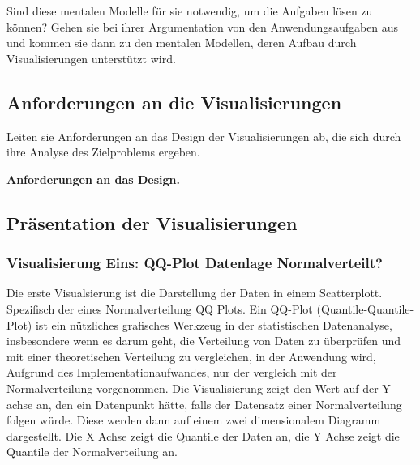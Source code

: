 \documentclass[usegeometry=true]{scrartcl}
\begin{document}
Sind diese mentalen Modelle für sie notwendig, um die Aufgaben lösen zu können? 
Gehen sie bei ihrer Argumentation von den Anwendungsaufgaben aus und kommen sie dann zu den mentalen Modellen, deren Aufbau durch Visualisierungen unterstützt wird. 
\subsection{Anforderungen an die Visualisierungen}
Leiten sie Anforderungen an das Design der Visualisierungen ab, die sich durch ihre Analyse des Zielproblems ergeben.

\textbf{ Anforderungen an das Design. }
\subsection{Präsentation der Visualisierungen}






\subsubsection{Visualisierung Eins: QQ-Plot Datenlage Normalverteilt?}

Die erste Visualsierung ist die Darstellung der Daten in einem Scatterplott. Spezifisch der eines Normalverteilung QQ Plots. 
Ein QQ-Plot (Quantile-Quantile-Plot) ist ein nützliches grafisches Werkzeug in der statistischen Datenanalyse, insbesondere wenn es darum geht, die Verteilung von Daten zu überprüfen und mit einer theoretischen Verteilung zu vergleichen, in der Anwendung wird, Aufgrund des Implementationaufwandes, nur der vergleich mit der Normalverteilung vorgenommen. 
Die Visualisierung zeigt den Wert auf der Y achse an, den ein Datenpunkt hätte, falls der Datensatz einer Normalverteilung folgen würde.
Diese werden dann auf einem zwei dimensionalem Diagramm dargestellt. Die X Achse zeigt die Quantile der Daten an, die Y Achse zeigt die Quantile der Normalverteilung an.
\end{document}
